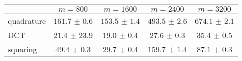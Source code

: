 \centering
\renewcommand{\arraystretch}{1.2}
\begin{tabular}{@{}lcccc@{}}
\toprule
 & $m=800$ & $m=1600$ & $m=2400$ & $m=3200$\\
\midrule
quadrature & $161.7$ $\pm$ $0.6$ & $153.5$ $\pm$ $1.4$ & $493.5$ $\pm$ $2.6$ & $674.1$ $\pm$ $2.1$ \\
DCT & $21.4$ $\pm$ $23.9$ & $19.0$ $\pm$ $0.4$ & $27.6$ $\pm$ $0.3$ & $35.4$ $\pm$ $0.5$ \\
squaring & $49.4$ $\pm$ $0.3$ & $29.7$ $\pm$ $0.4$ & $159.7$ $\pm$ $1.4$ & $87.1$ $\pm$ $0.3$ \\
\bottomrule
\end{tabular}
